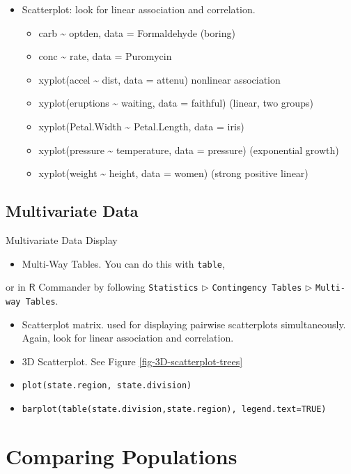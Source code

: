 \documentclass[captions=tableheading]{scrbook}
\begin{document}
\begin{itemize}
\item Scatterplot: look for linear association and correlation.
\begin{itemize}
\item carb \~{} optden, data = Formaldehyde (boring)
\item conc \~{} rate, data = Puromycin
\item xyplot(accel \~{} dist, data = attenu) nonlinear association
\item xyplot(eruptions \~{} waiting, data = faithful) (linear, two groups)
\item xyplot(Petal.Width \~{} Petal.Length, data = iris)
\item xyplot(pressure \~{} temperature, data = pressure) (exponential growth)
\item xyplot(weight \~{} height, data = women) (strong positive linear)
\end{itemize}
\end{itemize}
\subsection{Multivariate Data}
\label{sec-3-5-2}
\label{sub-Multivariate-Data}


Multivariate Data Display

\begin{itemize}
\item Multi-Way Tables. You can do this with \texttt{table},
\end{itemize}
or in \(\mathsf{R}\) Commander by following \texttt{Statistics} \(\triangleright\) \texttt{Contingency Tables} \(\triangleright\) \texttt{Multi-way Tables}.
\begin{itemize}
\item Scatterplot matrix. used for displaying pairwise scatterplots simultaneously. Again, look for linear association and correlation.
\item 3D Scatterplot. See Figure \ref{fig-3D-scatterplot-trees}
\item \texttt{plot(state.region, state.division)}
\item \texttt{barplot(table(state.division,state.region), legend.text=TRUE)}
\end{itemize}
\section{Comparing Populations}
\label{sec-3-6}
\label{sec-Comparing-Data-Sets}
\end{document}
